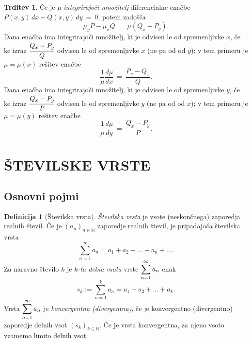 \documentclass[11pt]{article}
\theoremstyle{definition}
\newtheorem{definicija}{Definicija}[section]
\theoremstyle{definition}
\newtheorem{trditev}{Trditev}[section]
\theoremstyle{definition}
\theoremstyle{theorem}
\begin{document}
\begin{trditev}

Če je $\mu$ \textit{integrirajoči množitelj} diferencialne enačbe \\$P(x, y)\,dx + Q(x, y)\,dy ~=~ 0$, potem zadošča 
$$\mu_y P - \mu_x Q ~=~ \mu(Q_x - P_y).$$
Dana enačba ima integrirajoči množitelj, ki je odvisen le od spremenljivke $x$, če ke izraz $\cfrac{Q_x - P_y}{Q}$ odvisen le od spremenljivke $x$ (ne pa od od $y$); v tem primeru je $\mu = \mu(x)$ rešitev enačbe
$$\frac{1}{\mu} \frac{d\mu}{dx} ~=~ \frac{P_y - Q_x}{Q}.$$
Dana enačba ima integrirajoči množitelj, ki je odvisen le od spremenljivke $y$, če ke izraz $\cfrac{Q_x - P_y}{P}$ odvisen le od spremenljivke $y$ (ne pa od od $x$); v tem primeru je $\mu = \mu(y)$ rešitev enačbe
$$\frac{1}{\mu} \frac{d\mu}{dy} ~=~ \frac{Q_x - P_y}{P}.$$


\end{trditev}
\vspace{0.5cm}


\pagebreak


\section{ŠTEVILSKE VRSTE}
\vspace{0.5cm}


\subsection{Osnovni pojmi}
\vspace{0.5cm}

\begin{definicija}[Številska vrsta]

\textit{Številska vrsta} je vsote (neskončnega) zaporedja realnih števil. Če je $(a_n)_{n \in \mathbb{N}}$ zaporedje realnih števil, je pripadajoča številska vrsta
$$\sum_{n=1}^{\infty} a_n = a_1 + a_2 + \ldots + a_n + \ldots .$$
Za naravno število $k$ je \textit{$k$-ta delna vsota} vrste $\mathlarger{\sum_{n=1}^{\infty} a_n}$ enak
$$s_k := \sum_{n=1}^{k} a_n = a_1 + a_2 + \ldots + a_k.$$
Vrsta $\mathlarger{\sum_{n=1}^{\infty} a_n}$ je \textit{konvergentna (divergentna)}, če je konvergentno (divergentno) zaporedje delnih vsot $(s_k)_{k \in \mathbb{N}}$. Če je vrsta konvergentna, za njeno vsoto vzamemo limito delnih vsot.

\end{definicija}
\vspace{0.5cm}
\end{document}
